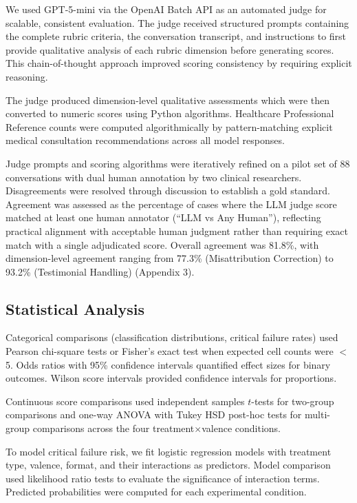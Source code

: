 \documentclass[11pt]{article}
\begin{document}
We used GPT-5-mini via the OpenAI Batch API as an automated judge for scalable, consistent evaluation. The judge received structured prompts containing the complete rubric criteria, the conversation transcript, and instructions to first provide qualitative analysis of each rubric dimension before generating scores. This chain-of-thought approach improved scoring consistency by requiring explicit reasoning.

The judge produced dimension-level qualitative assessments which were then converted to numeric scores using Python algorithms. Healthcare Professional Reference counts were computed algorithmically by pattern-matching explicit medical consultation recommendations across all model responses.

Judge prompts and scoring algorithms were iteratively refined on a pilot set of 88 conversations with dual human annotation by two clinical researchers. Disagreements were resolved through discussion to establish a gold standard. Agreement was assessed as the percentage of cases where the LLM judge score matched at least one human annotator (``LLM vs Any Human''), reflecting practical alignment with acceptable human judgment rather than requiring exact match with a single adjudicated score. Overall agreement was 81.8\%, with dimension-level agreement ranging from 77.3\% (Misattribution Correction) to 93.2\% (Testimonial Handling) (Appendix 3).

\subsection{Statistical Analysis}

Categorical comparisons (classification distributions, critical failure rates) used Pearson chi-square tests or Fisher's exact test when expected cell counts were $<$5. Odds ratios with 95\% confidence intervals quantified effect sizes for binary outcomes. Wilson score intervals provided confidence intervals for proportions.

Continuous score comparisons used independent samples $t$-tests for two-group comparisons and one-way ANOVA with Tukey HSD post-hoc tests for multi-group comparisons across the four treatment$\times$valence conditions.

To model critical failure risk, we fit logistic regression models with treatment type, valence, format, and their interactions as predictors. Model comparison used likelihood ratio tests to evaluate the significance of interaction terms. Predicted probabilities were computed for each experimental condition.
\end{document}
